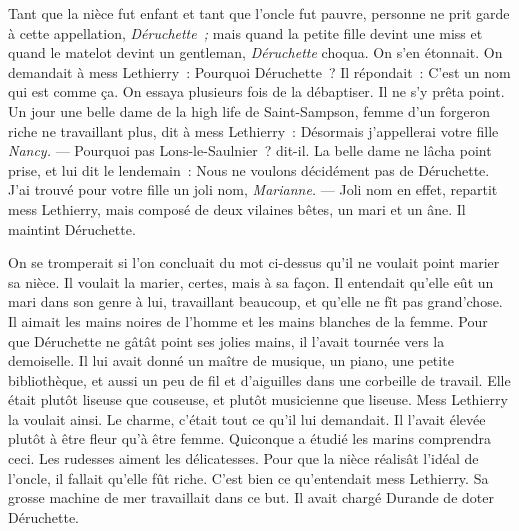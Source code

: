 \documentclass[french,twoside]{book} %
\begin{document}
Tant que la nièce fut enfant et tant que l’oncle fut pauvre, personne ne prit garde à cette appellation, \emph{Déruchette ;} mais quand la petite fille devint une miss et quand le matelot devint un gentleman, \emph{Déruchette }choqua. On s’en étonnait. On demandait à mess Lethierry : Pourquoi Déruchette ? Il répondait : C’est un nom qui est comme ça. On essaya plusieurs fois de la débaptiser. Il ne s’y prêta point. Un jour une belle dame de la high life de Saint-Sampson, femme d’un  forgeron riche ne travaillant plus, dit à mess Lethierry : Désormais j’appellerai votre fille \emph{Nancy.} — Pourquoi pas Lons-le-Saulnier ? dit-il. La belle dame ne lâcha point prise, et lui dit le lendemain : Nous ne voulons décidément pas de Déruchette. J’ai trouvé pour votre fille un joli nom, \emph{Marianne.} — Joli nom en effet, repartit mess Lethierry, mais composé de deux vilaines bêtes, un mari et un âne. Il maintint Déruchette.\par
On se tromperait si l’on concluait du mot ci-dessus qu’il ne voulait point marier sa nièce. Il voulait la marier, certes, mais à sa façon. Il entendait qu’elle eût un mari dans son genre à lui, travaillant beaucoup, et qu’elle ne fît pas grand’chose. Il aimait les mains noires de l’homme et les mains blanches de la femme. Pour que Déruchette ne gâtât point ses jolies mains, il l’avait tournée vers la demoiselle. Il lui avait donné un maître de musique, un piano, une petite bibliothèque, et aussi un peu de fil et d’aiguilles dans une corbeille de travail. Elle était plutôt liseuse que couseuse, et plutôt musicienne que liseuse. Mess Lethierry la voulait ainsi. Le charme, c’était tout ce qu’il lui demandait. Il l’avait élevée plutôt à être fleur qu’à être femme. Quiconque a étudié les marins comprendra ceci. Les rudesses aiment les délicatesses. Pour que la nièce réalisât l’idéal de l’oncle, il fallait qu’elle fût riche. C’est bien ce qu’entendait mess Lethierry. Sa grosse machine de mer travaillait dans ce but. Il avait chargé Durande de doter Déruchette.
\end{document}
